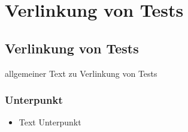 \chapter{Verlinkung von Tests}\label{linkTest}
\minitoc
\clearpage
\section{Verlinkung von Tests}
allgemeiner Text zu Verlinkung von Tests 

\subsection*{Unterpunkt}
\begin{itemize}
	\item Text Unterpunkt
\end{itemize}

\clearpage